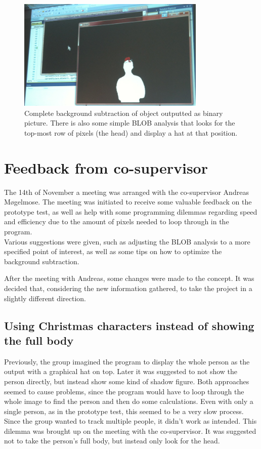 \begin{figure}[htbp]
\centering
\includegraphics[width=0.80\textwidth]{Pictures/Test/MaxSubtracted.jpg}
\caption{Complete background subtraction of object outputted as binary picture. There is also some simple BLOB analysis that looks for the top-most row of pixels (the head) and display a hat at that position.}
\label{fig:max_subtracted}
\end{figure}

\section{Feedback from co-supervisor}
The 14th of November a meeting was arranged with the co-supervisor Andreas M{\o}gelmose. The meeting was initiated to receive some valuable feedback on the prototype test, as well as help with some programming dilemmas regarding speed and efficiency due to the amount of pixels needed to loop through in the program.\\
Various suggestions were given, such as adjusting the BLOB analysis to a more specified point of interest, as well as some tips on how to optimize the background subtraction.

After the meeting with Andreas, some changes were made to the concept. It was decided that, considering the new information gathered, to take the project in a slightly different direction.

\subsection{Using Christmas characters instead of showing the full body}
Previously, the group imagined the program to display the whole person as the output with a graphical hat on top. Later it was suggested to not show the person directly, but instead show some kind of shadow figure. Both approaches seemed to cause problems, since the program would have to loop through the whole image to find the person and then do some calculations. Even with only a single person, as in the prototype test, this seemed to be a very slow process. Since the group wanted to track multiple people, it didn't work as intended. This dilemma was brought up on the meeting with the co-supervisor. It was suggested not to take the person's full body, but instead only look for the head.

